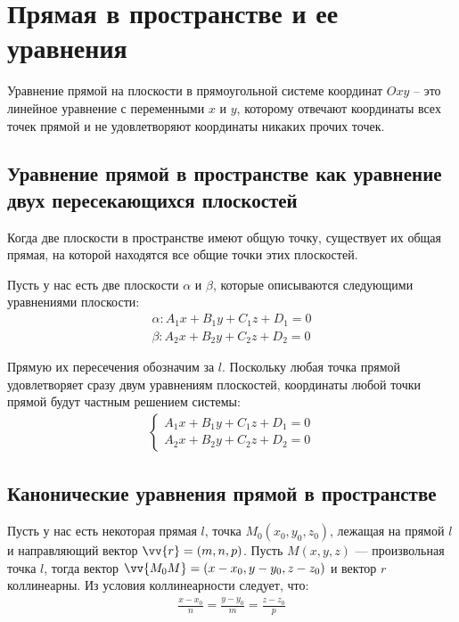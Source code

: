 \documentclass[a4paper,12pt]{extbook}
\theoremstyle{numbered}
\theoremstyle{named}
\theoremstyle{named}
\theoremstyle{named}
\begin{document}

\section{Прямая в пространстве и ее уравнения}\label{sec:line_in_space}
Уравнение прямой на плоскости в прямоугольной системе координат \(Oxy\) – это линейное уравнение с переменными \(x\) и \(y\), которому отвечают координаты всех точек прямой и не удовлетворяют координаты никаких прочих точек.

\subsection*{Уравнение прямой в пространстве как уравнение двух пересекающихся плоскостей}
Когда две плоскости в пространстве имеют общую точку, существует их общая прямая, на которой находятся все общие точки этих плоскостей.

Пусть у нас есть две плоскости \(\alpha\) и \(\beta\), которые описываются следующими уравнениями плоскости:
\begin{gather*}
    \alpha: A_1x + B_1y + C_1z + D_1 = 0 \\
    \beta: A_2x + B_2y + C_2z + D_2 = 0
\end{gather*}

Прямую их пересечения обозначим за \(l\). Поскольку любая точка прямой удовлетворяет сразу двум уравнениям плоскостей, координаты любой точки прямой будут частным решением системы:
\begin{gather*}
    \begin{cases}
        A_1x + B_1y + C_1z + D_1 = 0 \\
        A_2x + B_2y + C_2z + D_2 = 0
    \end{cases}
\end{gather*}

\subsection*{Канонические уравнения прямой в пространстве}
Пусть у нас есть некоторая прямая \(l\), точка \(M_0(x_0, y_0, z_0)\), лежащая на прямой \(l\) и направляющий вектор \(\vv{r} = (m, n, p)\). Пусть \(M(x, y, z)\) — произвольная точка \(l\), тогда вектор \(\vv{M_0M} = (x - x_0, y - y_0, z - z_0)\) и вектор \(r\) коллинеарны. Из условия коллинеарности следует, что:
\begin{gather*}
    \frac{x - x_0}{n} = \frac{y - y_0}{m} = \frac{z - z_0}{p}
\end{gather*}
\end{document}
